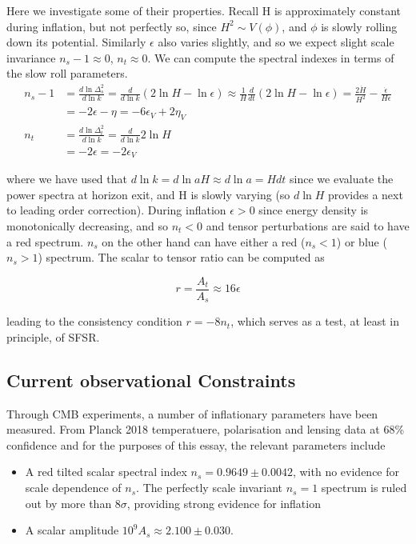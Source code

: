 \documentclass[a4paper,10pt]{article}
\begin{document}
Here we investigate some of their properties. Recall H is approximately constant during inflation, but not perfectly so, since $H^2 \sim V(\phi)$, and $\phi$ is slowly rolling down its potential. Similarly $\epsilon$ also varies slightly, and so we expect slight scale invariance $n_s-1\approx0$, $n_t\approx0$. We can compute the spectral indexes in terms of the slow roll parameters. 
\begin{equation}\begin{split}
n_s-1 &= \frac{d\ln{\Delta^2_s}}{d\ln{k}} = \frac{d}{d\ln{k}}(2\ln{H}-\ln{\epsilon}) \approx \frac{1}{H}\frac{d}{dt}(2\ln{H}-\ln{\epsilon}) = \frac{2\dot{H}}{H^2}-\frac{\dot{\epsilon}}{H\epsilon}\\
& = -2\epsilon-\eta = -6\epsilon_V+2\eta_V\\
n_t &= \frac{d\ln{\Delta^2_t}}{d\ln{k}} = \frac{d}{d\ln{k}}2\ln{H}\\
&=-2\epsilon=-2\epsilon_V
\end{split}\end{equation}

where we have used that $d\ln{k} = d\ln{aH} \approx d\ln{a} = Hdt$ since we evaluate the power spectra at horizon exit, and H is slowly varying (so $d\ln{H}$ provides a next to leading order correction). During inflation $\epsilon>0$ since energy density is monotonically decreasing, and so $n_t<0$ and tensor perturbations are said to have a red spectrum. $n_s$ on the other hand can have either a red ($n_s<1$) or blue ($n_s>1$) spectrum. The scalar to tensor ratio can be computed as

\begin{equation}
r=\frac{A_t}{A_s} \approx 16\epsilon
\end{equation}

leading to the consistency condition $r=-8n_t$, which serves as a test, at least in principle, of SFSR.


\subsection{Current observational Constraints}


Through CMB experiments, a number of inflationary parameters have been measured. From Planck 2018 temperatuere, polarisation and lensing data at 68\% confidence \cite{Planck} and for the purposes of this essay, the relevant parameters include
 
\begin{itemize}
\item A red tilted scalar spectral index $n_s =0.9649 \pm 0.0042$, with no evidence for scale dependence of $n_s$. The perfectly scale invariant $n_s=1$ spectrum is ruled out by more than $8\sigma$, providing strong evidence for inflation
\item A scalar amplitude  $10^9 A_s \approx 2.100 \pm 0.030$.
\end{itemize}
\end{document}
